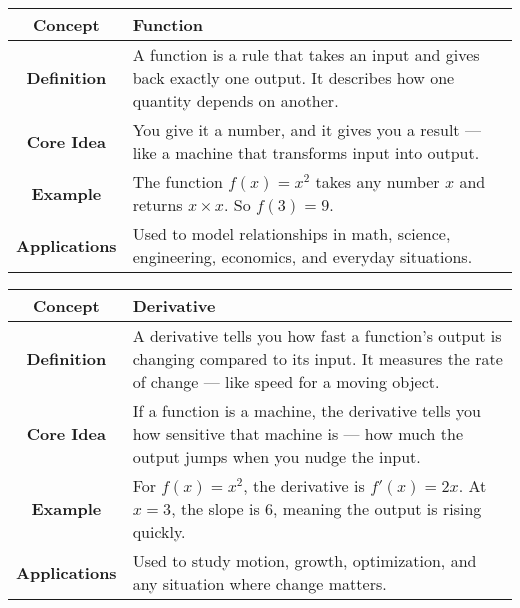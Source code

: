 
\begin{NxLightBox}[title={Function}]
    \begingroup
    \renewcommand{\arraystretch}{1.8}
    \begin{tabularx}{\linewidth}{|c|X|}
        \hline
        \textbf{Concept} & Function \\
        \hline
        \textbf{Definition} & A function is a rule that takes an input and gives back exactly one output. It describes how one quantity depends on another. \\
        \hline
        \textbf{Core Idea} & You give it a number, and it gives you a result — like a machine that transforms input into output. \\
        \hline
        \textbf{Example} & The function \( f(x) = x^2 \) takes any number \( x \) and returns \( x \times x \). So \( f(3) = 9 \). \\
        \hline
        \textbf{Applications} & Used to model relationships in math, science, engineering, economics, and everyday situations. \\
        \hline
    \end{tabularx}
    \endgroup
\end{NxLightBox}

\begin{NxLightBox}[title={Derivative}]
    \begingroup
    \renewcommand{\arraystretch}{1.8}
    \begin{tabularx}{\linewidth}{|c|X|}
        \hline
        \textbf{Concept} & Derivative \\
        \hline
        \textbf{Definition} & A derivative tells you how fast a function’s output is changing compared to its input. It measures the rate of change — like speed for a moving object. \\
        \hline
        \textbf{Core Idea} & If a function is a machine, the derivative tells you how sensitive that machine is — how much the output jumps when you nudge the input. \\
        \hline
        \textbf{Example} & For \( f(x) = x^2 \), the derivative is \( f'(x) = 2x \). At \( x = 3 \), the slope is \( 6 \), meaning the output is rising quickly. \\
        \hline
        \textbf{Applications} & Used to study motion, growth, optimization, and any situation where change matters. \\
        \hline
    \end{tabularx}
    \endgroup
\end{NxLightBox}

